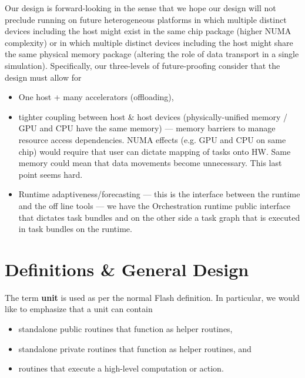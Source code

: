 \documentclass{article}
\begin{document}
Our design is forward-looking in the sense that we hope our
design will not preclude running on future heterogeneous platforms in which
multiple distinct devices including the host might exist in the same chip
package (higher NUMA complexity) or in which multiple distinct devices including
the host might share the same physical memory package (altering the role of data
transport in a single simulation).  Specifically, our three-levels of
future-proofing consider that the design must allow for
\begin{itemize}
\item{One host + many accelerators (offloading),}
\item{tighter coupling between host \& host devices
(physically-unified memory / GPU and CPU have the same memory) --- memory
barriers to manage resource access dependencies.  NUMA effects (e.g. GPU and CPU
on same chip) would require that user can dictate mapping of tasks onto HW.
Same memory could mean that data movements become unnecessary.  This last point
seems hard.}
\item{Runtime adaptiveness/forecasting --- this is the interface between the
runtime and the off line tools --- we have the Orchestration runtime public
interface that dictates task bundles and on the other side a task graph that is
executed in task bundles on the runtime.}
\end{itemize}

\section{Definitions \& General Design}
The term \textbf{unit} is used as per the normal Flash definition.  In
particular, we would like to emphasize that a unit can contain
\begin{itemize}
\item{standalone public routines that function as helper routines,}
\item{standalone private routines that function as helper routines, and}
\item{routines that execute a high-level computation or action.}
\end{itemize}
\end{document}
